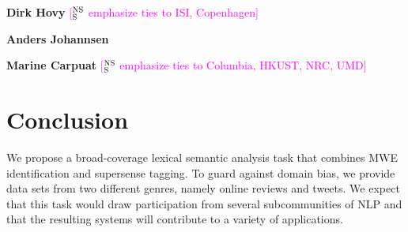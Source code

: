 \documentclass[11pt]{article}
\newcommand{\ensuretext}[1]{#1}
\newcommand{\nssmarker}{\ensuretext{\textcolor{magenta}{\ensuremath{^{\textsc{NS}}_{\textsc{S}}}}}}
\newcommand{\arkcomment}[3]{\ensuretext{\textcolor{#3}{[#1 #2]}}}
\newcommand{\nss}[1]{\arkcomment{\nssmarker}{#1}{magenta}}
\begin{document}
\textbf{Dirk Hovy} \nss{emphasize ties to ISI, Copenhagen}

\textbf{Anders Johannsen}

\textbf{Marine Carpuat} \nss{emphasize ties to Columbia, HKUST, NRC, UMD}

\section{Conclusion}
We propose a broad-coverage lexical semantic analysis task that combines MWE identification and supersense tagging. 
To guard against domain bias, we provide data sets from two different genres, namely online reviews and tweets. 
We expect that this task would draw participation from several subcommunities of NLP 
and that the resulting systems will contribute to a variety of applications.
\end{document}
